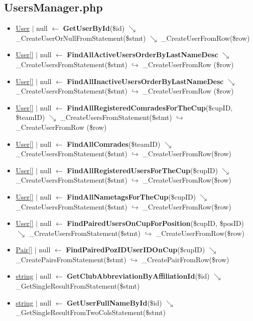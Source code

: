\subsection{UsersManager.php}
\begin{itemize}
  \setlength\itemsep{0em}
  \item \underline{User} $\vert$ null $\leftarrow$ \textbf{GetUserById}(\$id) $\searrow$ \_CreateUserOrNullFromStatement(\$stmt) $\searrow$ \_CreateUserFromRow(\$row)
  \item \underline{User[]} $\vert$ null $\leftarrow$ \textbf{FindAllActiveUsersOrderByLastNameDesc} $\searrow$ \_CreateUsersFromStatement(\$stmt) $\hookrightarrow$ \_CreateUserFromRow (\$row)
  \item \underline{User[]} $\vert$ null $\leftarrow$ \textbf{FindAllInactiveUsersOrderByLastNameDesc} $\searrow$ \_CreateUsersFromStatement(\$stmt) $\hookrightarrow$ \_CreateUserFromRow (\$row)
  \item \underline{User[]} $\vert$ null $\leftarrow$ \textbf{FindAllRegisteredComradesForTheCup}(\$cupID, \$teamID) $\searrow$ \_CreateUsersFromStatement(\$stmt) $\hookrightarrow$ \_CreateUserFromRow (\$row)
  \item \underline{User[]} $\vert$ null $\leftarrow$ \textbf{FindAllComrades}(\$teamID) $\searrow$ \_CreateUsersFromStatement(\$stmt) $\hookrightarrow$ \_CreateUserFromRow(\$row)
  \item \underline{User[]} $\vert$ null $\leftarrow$ \textbf{FindAllRegisteredUsersForTheCup}(\$cupID) $\searrow$ \_CreateUsersFromStatement(\$stmt) $\hookrightarrow$ \_CreateUserFromRow(\$row)
  \item \underline{User[]} $\vert$ null $\leftarrow$ \textbf{FindAllNametagsForTheCup}(\$cupID) $\searrow$ \_CreateUsersFromStatement(\$stmt) $\hookrightarrow$ \_CreateUserFromRow(\$row)
  \item \underline{User[]} $\vert$ null $\leftarrow$ \textbf{FindPairedUsersOnCupForPosition}(\$cupID, \$posID) $\searrow$ \_CreateUsersFromStatement(\$stmt) $\hookrightarrow$ \_CreateUserFromRow(\$row)
  \item \underline{Pair[]} $\vert$ null $\leftarrow$ \textbf{FindPairedPozIDUserIDOnCup}(\$cupID) $\searrow$ \_CreatePairsFromStatement(\$stmt) $\hookrightarrow$ \_CreatePairFromRow(\$row)
  \item \underline{string} $\vert$ null $\leftarrow$ \textbf{GetClubAbbreviationByAffiliationId}(\$id) $\searrow$ \_GetSingleResultFromStatement(\$stmt)
  \item \underline{string} $\vert$ null $\leftarrow$ \textbf{GetUserFullNameById}(\$id) $\searrow$ \_GetSingleResultFromTwoColsStatement(\$stmt)

\end{itemize}
